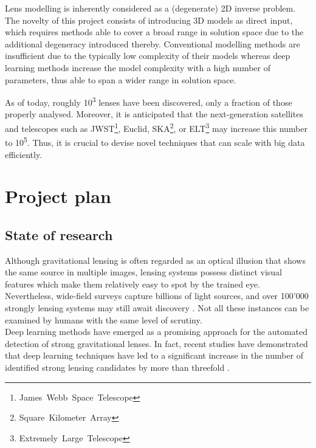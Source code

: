 \documentclass[a4paper,10pt]{article}
\begin{document}
Lens modelling is inherently considered as a (degenerate) 2D inverse
problem. The novelty of this project consists of introducing 3D models
as direct input, which requires methods able to cover a broad range in
solution space due to the additional degeneracy introduced
thereby. Conventional modelling methods are insufficient due to the
typically low complexity of their models whereas deep learning methods
increase the model complexity with a high number of parameters, thus
able to span a wider range in solution space.

As of today, roughly 10\textsuperscript{3} lenses have been discovered, only a fraction
of those properly analysed. Moreover, it is anticipated that the
next-generation satellites and telescopes such as
JWST\footnote{James~Webb~Space~Telescope}, Euclid,
SKA\footnote{Square~Kilometer~Array}, or
ELT\footnote{Extremely~Large~Telescope} may increase this number to
10\textsuperscript{5}. Thus, it is crucial to devise novel techniques that can scale
with big data efficiently.


\newpage
\section*{Project plan}
\label{sec:org50f3a28}

\subsection*{State of research}
\label{sec:org43e2fd3}

Although gravitational lensing is often regarded as an optical
illusion that shows the same source in multiple images, lensing
systems possess distinct visual features which make them relatively
easy to spot by the trained eye. Nevertheless, wide-field surveys
capture billions of light sources, and over 100'000 strongly lensing
systems may still await discovery
\citep{Taak20,Taak23,Collett15}. Not all these instances can be
examined by humans with the same level of scrutiny. \\[0pt]
Deep learning methods have emerged as a promising approach for the
automated detection of strong gravitational lenses. In fact, recent
studies have demonstrated that deep learning techniques have led to a
significant increase in the number of identified strong lensing
candidates by more than threefold
\citep{Storfer22,Huang21,Rezaei22,Wilde22}.
\end{document}
